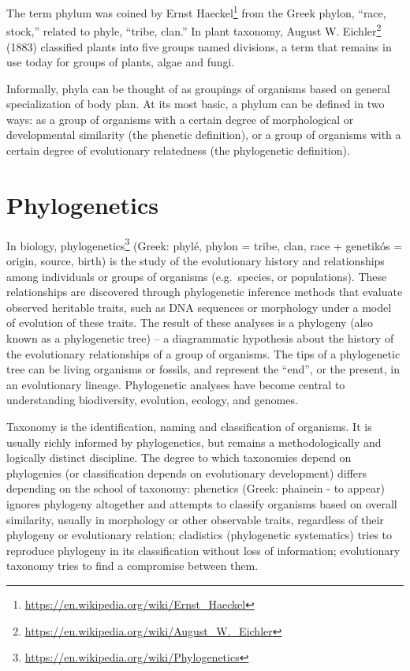 \documentclass[]{book}
\let\rmarkdownfootnote\footnote%
\def\footnote{\protect\rmarkdownfootnote}
\renewcommand{\href}[2]{#2\footnote{\url{#1}}}
\begin{document}
The term phylum was coined by \href{https://en.wikipedia.org/wiki/Ernst_Haeckel}{Ernst Haeckel} from the Greek phylon, ``race, stock,'' related to phyle, ``tribe, clan.'' In plant taxonomy, \href{https://en.wikipedia.org/wiki/August_W._Eichler}{August W. Eichler} (1883) classified plants into five groups named divisions, a term that remains in use today for groups of plants, algae and fungi.

Informally, phyla can be thought of as groupings of organisms based on general specialization of body plan. At its most basic, a phylum can be defined in two ways: as a group of organisms with a certain degree of morphological or developmental similarity (the phenetic definition), or a group of organisms with a certain degree of evolutionary relatedness (the phylogenetic definition).

\hypertarget{phylogenetics}{%
\section{Phylogenetics}\label{phylogenetics}}

In biology, \href{https://en.wikipedia.org/wiki/Phylogenetics}{phylogenetics} (Greek: phylé, phylon = tribe, clan, race + genetikós = origin, source, birth) is the study of the evolutionary history and relationships among individuals or groups of organisms (e.g.~species, or populations). These relationships are discovered through phylogenetic inference methods that evaluate observed heritable traits, such as DNA sequences or morphology under a model of evolution of these traits. The result of these analyses is a phylogeny (also known as a phylogenetic tree) -- a diagrammatic hypothesis about the history of the evolutionary relationships of a group of organisms. The tips of a phylogenetic tree can be living organisms or fossils, and represent the ``end'', or the present, in an evolutionary lineage. Phylogenetic analyses have become central to understanding biodiversity, evolution, ecology, and genomes.

Taxonomy is the identification, naming and classification of organisms. It is usually richly informed by phylogenetics, but remains a methodologically and logically distinct discipline. The degree to which taxonomies depend on phylogenies (or classification depends on evolutionary development) differs depending on the school of taxonomy: phenetics (Greek: phainein - to appear) ignores phylogeny altogether and attempts to classify organisms based on overall similarity, usually in morphology or other observable traits, regardless of their phylogeny or evolutionary relation; cladistics (phylogenetic systematics) tries to reproduce phylogeny in its classification without loss of information; evolutionary taxonomy tries to find a compromise between them.  
\end{document}
